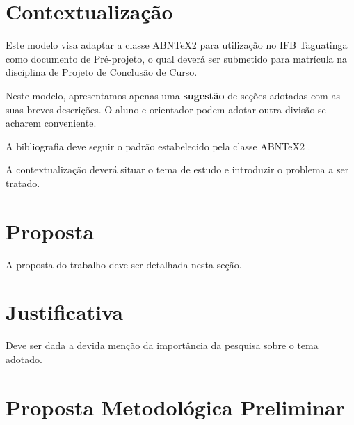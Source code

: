 \documentclass[bacharelado]{pre-projeto-computacao}
\begin{document}
\frenchspacing 
\imprimircapa
\imprimirfolhaderosto



\section*{Contextualização}
	Este modelo visa adaptar a classe ABNTeX2 para utilização no IFB Taguatinga como documento de Pré-projeto, o qual deverá ser submetido para matrícula na disciplina de Projeto de Conclusão de Curso.
	
	Neste modelo, apresentamos apenas uma \textbf{sugestão} de seções adotadas com as suas breves descrições. O aluno e orientador podem adotar outra divisão se acharem conveniente.
	
	A bibliografia deve seguir o padrão estabelecido pela classe ABNTeX2 \cite{abntex2modelo-relatorio}.
	
	A contextualização deverá situar o tema de estudo e introduzir o problema a ser tratado.

\section*{Proposta}
	A proposta do trabalho deve ser detalhada nesta seção.

\section*{Justificativa}
	Deve ser dada a devida menção da importância da pesquisa sobre o tema adotado.	

\section*{Proposta Metodológica Preliminar}


\end{document}
